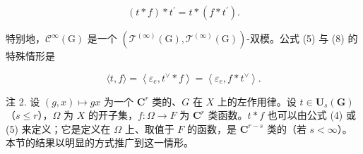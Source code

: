 \[
(t * f) * t ^ {\prime} = t * (f * t ^ {\prime}).\tag{14}
\]

特别地，\(\mathcal{C}^{\infty}(\mathrm{G})\) 是一个 \((\mathcal{T}^{(\infty)}(\mathrm{G}),\mathcal{T}^{(\infty)}(\mathrm{G}))\)-双模。公式 (5) 与 (8) 的特殊情形是

\[
\langle t, f \rangle = \left\langle \varepsilon_ {e}, t ^ {\vee} * f \right\rangle = \left\langle \varepsilon_ {e}, f * t ^ {\vee} \right\rangle .\tag{15}
\]

注 2. 设 \((g,x)\mapsto gx\) 为一个 \(\mathbf{C}^r\) 类的、\(G\) 在 \(X\) 上的左作用律。设 \(t\in \mathbf{U}_s(\mathbf{G})\)（\(s\leqslant r\)），\(\Omega\) 为 \(X\) 的开子集，\(f\colon \Omega \to F\) 为 \(\mathbf{C}^r\) 类函数。\(t*f\) 也可以由公式 (4) 或 (5) 来定义；它是定义在 \(\Omega\) 上、取值于 \(F\) 的函数，是 \(\mathbf{C}^{r - s}\) 类的（若 \(s < \infty\)）。本节的结果以明显的方式推广到这一情形。

